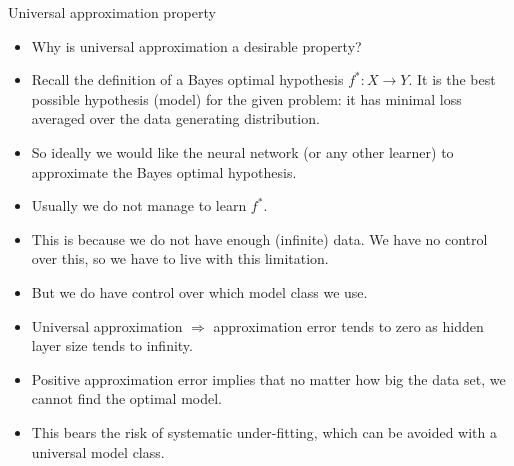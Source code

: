 \documentclass[11pt,compress,t,notes=noshow, xcolor=table]{beamer}
\begin{document}
\begin{vbframe}{Universal approximation property}
  \framebreak

  \begin{itemize}
  \item Why is universal approximation a desirable property?
  \vspace{2mm}
  \item Recall the definition of a Bayes optimal hypothesis $f^* : X \to Y$.
    It is the best possible hypothesis (model) for the given problem:
    it has minimal loss averaged over the data generating distribution.
  \vspace{2mm}
  \item So ideally we would like the neural network (or any other
    learner) to approximate the Bayes optimal hypothesis.
  \vspace{2mm}
  \item Usually we do not manage to learn $f^*$.
  \vspace{2mm}
  \item This is because we do not have enough (infinite) data. We have
    no control over this, so we have to live with this limitation.
  \vspace{2mm}
  \item But we do have control over which model class we use.
  \end{itemize}

  \framebreak

  \begin{itemize}
    \vspace{10mm}
    \item Universal approximation $\Rightarrow$ approximation error tends
    to zero as hidden layer size tends to infinity.
    \vspace{5mm}
    \item Positive approximation error implies that no matter  how %
    big the data set, we cannot find the optimal model.
    \vspace{5mm}
    \item This bears the risk of systematic under-fitting, which can be avoided with a universal model class.
  \end{itemize}

  \framebreak


\end{vbframe}
\end{document}
